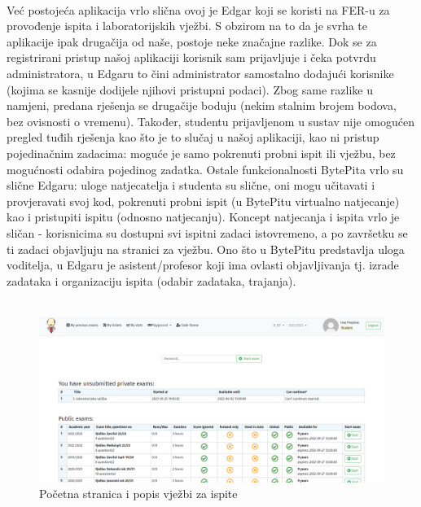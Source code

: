 		\noindent\\
		Već postojeća aplikacija vrlo slična ovoj je Edgar koji se koristi na FER-u za provođenje ispita i laboratorijskih vježbi.	S obzirom na to da je svrha te aplikacije ipak drugačija od naše, postoje neke značajne razlike. Dok se za registrirani pristup našoj aplikaciji korisnik sam prijavljuje i čeka potvrdu administratora, u Edgaru to čini administrator samostalno dodajući korisnike (kojima se kasnije dodijele njihovi pristupni podaci). Zbog same razlike u namjeni, predana rješenja se drugačije boduju (nekim stalnim brojem bodova, bez ovisnosti o vremenu). Također, studentu prijavljenom u sustav nije omogućen pregled tuđih rješenja kao što je to slučaj u našoj aplikaciji, kao ni pristup pojedinačnim zadacima: moguće je samo pokrenuti probni ispit ili vježbu, bez mogućnosti odabira pojedinog zadatka.
		Ostale funkcionalnosti BytePita vrlo su slične Edgaru: uloge natjecatelja i studenta su slične, oni mogu učitavati i provjeravati svoj kod, pokrenuti probni ispit (u BytePitu virtualno natjecanje) kao i pristupiti ispitu (odnosno natjecanju). Koncept natjecanja i ispita vrlo je sličan - korisnicima su dostupni svi ispitni zadaci istovremeno, a po završetku se ti zadaci objavljuju na stranici za vježbu. 
		Ono što u BytePitu predstavlja uloga voditelja, u Edgaru je asistent/profesor koji ima ovlasti objavljivanja tj. izrade zadataka i organizaciju ispita (odabir zadataka, trajanja).	\\
		
		\\
		\begin{figure}[H]
			\includegraphics[scale=0.4]{slike/edgar1}
			\centering
			\caption{Početna stranica i popis vježbi za ispite}
			\label{fig:pocstr}
		\end{figure}
		
